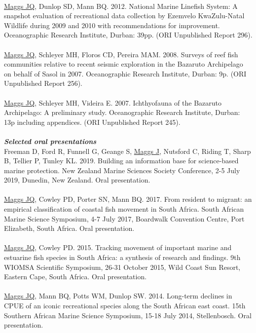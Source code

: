 \documentclass[10pt,a4paper]{article}
\begin{document}
\\
\underline{Maggs JQ}, Dunlop SD, Mann BQ. 2012. National Marine Linefish System: A snapshot evaluation of recreational data collection by Ezemvelo KwaZulu-Natal Wildlife during 2009 and 2010 with recommendations for improvement. Oceanographic Research Institute, Durban: 39pp. (ORI Unpublished Report 296).\\
\\
\underline{Maggs JQ}, Schleyer MH, Floros CD, Pereira MAM. 2008. Surveys of reef fish communities relative to recent seismic exploration in the Bazaruto Archipelago on behalf of Sasol in 2007. Oceanographic Research Institute, Durban: 9p. (ORI Unpublished Report 256).\\
\\
\underline{Maggs JQ}, Schleyer MH, Videira E. 2007. Ichthyofauna of the Bazaruto Archipelago: A preliminary study. Oceanographic Research Institute, Durban: 13p including appendices. (ORI Unpublished Report 245).\\
\\
\textit{\textbf{Selected oral presentations}}\\
Freeman D, Ford R, Funnell G, Geange S, \underline{Maggs J}, Nutsford C, Riding T, Sharp B, Tellier P, Tunley KL. 2019. Building an information base for science-based marine protection. New Zealand Marine Sciences Society Conference, 2-5 July 2019, Dunedin, New Zealand. Oral presentation.\\
\\
\underline{Maggs JQ}, Cowley PD, Porter SN, Mann BQ. 2017. From resident to migrant: an empirical classification of coastal fish movement in South Africa. South African Marine Science Symposium, 4-7 July 2017, Boardwalk Convention Centre, Port Elizabeth, South Africa. Oral presentation.\\
\\
\underline{Maggs JQ}, Cowley PD. 2015. Tracking movement of important marine and estuarine fish species in South Africa: a synthesis of research and findings. 9th WIOMSA Scientific Symposium, 26-31 October 2015, Wild Coast Sun Resort, Eastern Cape, South Africa. Oral presentation.\\
\\
\underline{Maggs JQ}, Mann BQ, Potts WM, Dunlop SW. 2014. Long-term declines in CPUE of an iconic recreational species along the South African east coast. 15th Southern African Marine Science Symposium, 15-18 July 2014, Stellenbosch. Oral presentation.\\
\\
\end{document}
